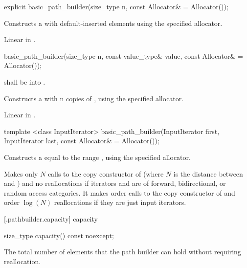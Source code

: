 %
\begin{itemdecl}
explicit basic_path_builder(size_type n, const Allocator& = Allocator());
\end{itemdecl}
\begin{itemdescr}
\pnum
\effects
Constructs a  with  default-inserted elements using the specified allocator.

\pnum
\complexity
Linear in .
\end{itemdescr}

%
\begin{itemdecl}
basic_path_builder(size_type n, const value_type& value,
  const Allocator& = Allocator());
\end{itemdecl}
\begin{itemdescr}
\pnum
\requires
{} shall be  into .

\pnum
\effects
Constructs a  with n copies of , using the specified allocator.

\pnum
\complexity
Linear in .
\end{itemdescr}

%
\begin{itemdecl}
template <class InputIterator>
basic_path_builder(InputIterator first, InputIterator last,
  const Allocator& = Allocator());
\end{itemdecl}
\begin{itemdescr}
\pnum
\effects
Constructs a  equal to the range , using the specified allocator.

\pnum
\complexity
Makes only $N$ calls to the copy constructor of  (where $N$
is the distance between
and
)
and no reallocations if iterators  and  are of forward, bidirectional, or random access categories.
It makes order
calls to the copy constructor of
and order
$\log(N)$
reallocations if they are just input iterators.

\end{itemdescr}

 [\iotwod.pathbuilder.capacity] { capacity}%

%
\begin{itemdecl}
size_type capacity() const noexcept;
\end{itemdecl}
\begin{itemdescr}
\pnum
\returns
The total number of elements that the path builder can hold without requiring reallocation.
\end{itemdescr}


